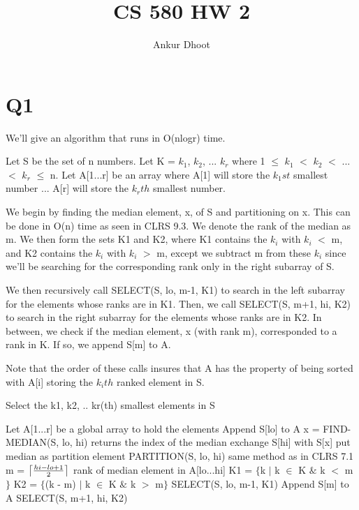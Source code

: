 \documentclass[11pt,a4paper]{article}
\DeclarePairedDelimiter\ceil{\lceil}{\rceil}
\begin{document}
\author{Ankur Dhoot}
\title{CS 580 HW 2}
\maketitle

\section*{Q1}
We'll give an algorithm that runs in O(nlogr) time. 

Let S be the set of n numbers. Let K = {$k_{1}$, $k_{2}$, ... $k_{r}$} where 1 $\leq$ $k_{1}$ $<$ $k_{2}$ $<$ ... $<$ $k_{r}$ $\leq$ n. Let A[1...r] be an array where A[1] will store the $k_{1}st$ smallest number ... A[r] will store the $k_{r}th$ smallest number. 

We begin by finding the median element, x, of S and partitioning on x. This can be done in O(n) time as seen in CLRS 9.3. We denote the rank of the median as m. We then form the sets K1 and K2, where K1 contains the $k_{i}$ with $k_i$ $<$ m, and K2 contains the $k_i$ with $k_i$ $>$ m, except we subtract m from these $k_{i}$ since we'll be searching for the corresponding rank only in the right subarray of S. 

We then recursively call SELECT(S, lo, m-1, K1) to search in the left subarray for the elements whose ranks are in K1. Then, we call SELECT(S, m+1, hi, K2) to search in the right subarray for the elements whose ranks are in K2. In between, we check if the median element, x (with rank m), corresponded to a rank in K. If so, we append S[m] to A.

Note that the order of these calls insures that A has the property of being sorted with A[i] storing the $k_{i}th$ ranked element in S. 
\begin{algorithm}
	\caption{Select the k1, k2, .. kr(th) smallest elements in S}
	\begin{algorithmic}[1]
	\State Let A[1...r] be a global array to hold the elements
		\State Append S[lo] to A
	\EndIf
	\State x = FIND-MEDIAN(S, lo, hi)  \Comment returns the index of the median
	\State exchange S[hi] with S[x]    \Comment put median as partition element
	\State PARTITION(S, lo, hi)        \Comment same method as in CLRS 7.1
	\State m = $\ceil*{\frac{hi - lo + 1}{2}}$  \Comment rank of median element in A[lo...hi]
	\State K1 = $\{$k $|$ k $\in$ K $\&$ k $<$ m$\}$ 
	\State K2 = $\{$(k - m) $|$ k $\in$ K $\&$ k $>$ m$\}$
		\State SELECT(S, lo, m-1, K1)
	\EndIf
		\State Append S[m] to A
	\EndIf
		\State SELECT(S, m+1, hi, K2)
	\EndIf
	\EndFunction
	\end{algorithmic}
	\end{algorithm}
\end{document}
